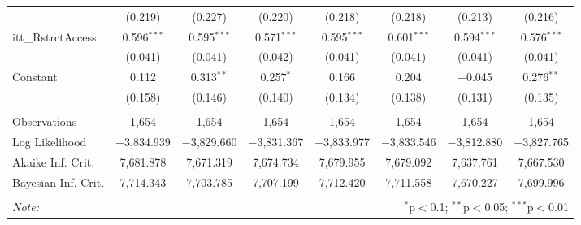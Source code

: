 \begin{sidewaystable}[!htbp]
\begin{tabular}{@{\extracolsep{5pt}}lccccccc}
  & (0.219) & (0.227) & (0.220) & (0.218) & (0.218) & (0.213) & (0.216) \\ 
  itt\_RstrctAccess & 0.596$^{***}$ & 0.595$^{***}$ & 0.571$^{***}$ & 0.595$^{***}$ & 0.601$^{***}$ & 0.594$^{***}$ & 0.576$^{***}$ \\ 
  & (0.041) & (0.041) & (0.042) & (0.041) & (0.041) & (0.041) & (0.041) \\ 
  Constant & 0.112 & 0.313$^{**}$ & 0.257$^{*}$ & 0.166 & 0.204 & $-$0.045 & 0.276$^{**}$ \\ 
  & (0.158) & (0.146) & (0.140) & (0.134) & (0.138) & (0.131) & (0.135) \\ 
 \hline \\[-1.8ex] 
Observations & 1,654 & 1,654 & 1,654 & 1,654 & 1,654 & 1,654 & 1,654 \\ 
Log Likelihood & $-$3,834.939 & $-$3,829.660 & $-$3,831.367 & $-$3,833.977 & $-$3,833.546 & $-$3,812.880 & $-$3,827.765 \\ 
Akaike Inf. Crit. & 7,681.878 & 7,671.319 & 7,674.734 & 7,679.955 & 7,679.092 & 7,637.761 & 7,667.530 \\ 
Bayesian Inf. Crit. & 7,714.343 & 7,703.785 & 7,707.199 & 7,712.420 & 7,711.558 & 7,670.227 & 7,699.996 \\ 
\hline 
\hline \\[-1.8ex] 
\textit{Note:}  & \multicolumn{7}{r}{$^{*}$p$<$0.1; $^{**}$p$<$0.05; $^{***}$p$<$0.01} \\ 
\end{tabular} 
\end{sidewaystable} 
